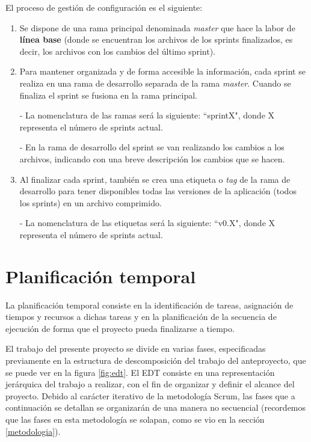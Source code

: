 \noindent
El proceso de gestión de configuración es el siguiente:
\begin{enumerate}
\item Se dispone de una rama principal denominada \textit{master} que hace la labor de \textbf{línea base} (donde se encuentran los archivos de los sprints finalizados, es decir, los archivos con los cambios del último sprint).
\item Para mantener organizada y de forma accesible la información, cada sprint se realiza en una rama de desarrollo separada de la rama \textit{master}. Cuando se finaliza el sprint se fusiona en la rama principal.

- La nomenclatura de las ramas será la siguiente: ``sprintX", donde X representa el número de sprints actual.

- En la rama de desarrollo del sprint se van realizando los cambios a los archivos, indicando con una breve descripción los cambios que se hacen.
\item Al finalizar cada sprint, también se crea una etiqueta o \textit{tag} de la rama de desarrollo para tener disponibles todas las versiones de la aplicación (todos los sprints) en un archivo comprimido.

- La nomenclatura de las etiquetas será la siguiente: ``v0.X", donde X representa el número de sprints actual.
\end{enumerate}

\section{Planificación temporal} \label{plantemp}
La planificación temporal consiste en la identificación de tareas, asignación de tiempos y recursos a dichas tareas y en la planificación de la secuencia de ejecución de forma que el proyecto pueda finalizarse a tiempo. 

El trabajo del presente proyecto se divide en varias fases, especificadas previamente en la estructura de descomposición del trabajo del anteproyecto, que se puede ver en la figura \ref{fig:edt}. El EDT consiste en una representación jerárquica del trabajo a realizar, con el fin de organizar y definir el alcance del proyecto. Debido al carácter iterativo de la metodología Scrum, las fases que a continuación se detallan se organizarán de una manera no secuencial (recordemos que las fases en esta metodología se solapan, como se vio en la sección \ref{metodologia}).

